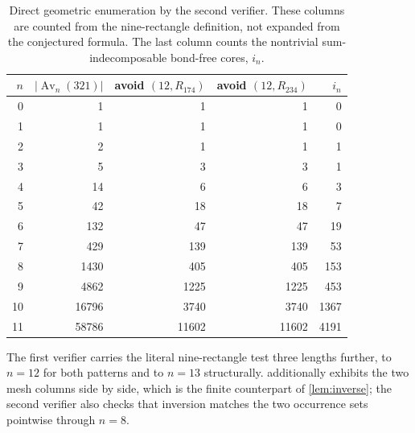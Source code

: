 \documentclass[11pt,letterpaper]{article}
\numberwithin{equation}{section}
\theoremstyle{definition}
\DeclareMathOperator{\Av}{Av}
\newcommand{\Rone}{R_{174}}
\newcommand{\Rtwo}{R_{234}}
\begin{document}
\begin{table}[ht]
\centering
\caption{Direct geometric enumeration by the second verifier. These
columns are counted from the nine-rectangle definition, not expanded from
the conjectured formula. The last column counts the nontrivial
sum-indecomposable bond-free cores, $i_n$.}
\begin{tabular}{r r r r r}
\toprule
$n$ & $|\Av_n(321)|$ & avoid $(12,\Rone)$ & avoid $(12,\Rtwo)$ & $i_n$\\
\midrule
0 & 1 & 1 & 1 & 0\\
1 & 1 & 1 & 1 & 0\\
2 & 2 & 1 & 1 & 1\\
3 & 5 & 3 & 3 & 1\\
4 & 14 & 6 & 6 & 3\\
5 & 42 & 18 & 18 & 7\\
6 & 132 & 47 & 47 & 19\\
7 & 429 & 139 & 139 & 53\\
8 & 1430 & 405 & 405 & 153\\
9 & 4862 & 1225 & 1225 & 453\\
10 & 16796 & 3740 & 3740 & 1367\\
11 & 58786 & 11602 & 11602 & 4191\\
\bottomrule
\end{tabular}
\label{tab:exhaustive}
\end{table}

The first verifier carries the literal nine-rectangle test three lengths
further, to $n=12$ for both patterns and to $n=13$ structurally.
 additionally exhibits the two mesh columns side by
side, which is the finite counterpart of \cref{lem:inverse}; the second
verifier also checks that inversion matches the two occurrence sets
pointwise through $n=8$.
\end{document}
